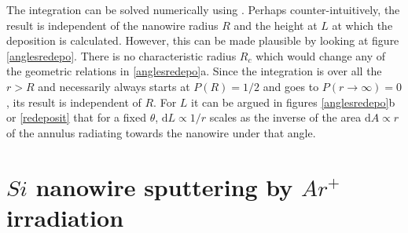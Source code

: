 The integration can be solved numerically using . Perhaps counter-intuitively, the result is independent of the nanowire radius $R$ and the height at $L$ at which the deposition is calculated. However, this can be made plausible by looking at figure \ref{anglesredepo}. There is no characteristic radius $R_c$ which would change any of the geometric relations in \ref{anglesredepo}a. Since the integration is over all the $r > R$ and necessarily always starts at $P(R) =1/2$ and goes to $P(r\rightarrow \infty) =0$, its result is independent of $R$. For $L$ it can be argued in figures \ref{anglesredepo}b or \ref{redeposit} that for a fixed $\theta$, $\mathrm{d}L \propto 1/r$ scales as the inverse of the area $\mathrm{d}A \propto r$ of the annulus radiating towards the nanowire under that angle.

 
\section{$Si$ nanowire sputtering by $Ar^+$ irradiation}
\label{sec:sisputtering}